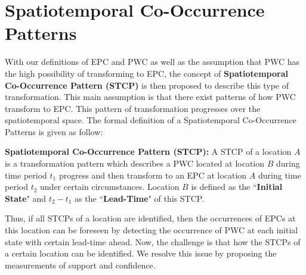 \documentclass{acm_proc_article-sp}
\begin{document}
\section{Spatiotemporal Co-Occurrence Patterns}
\label{sec:stcopattern}
With our definitions of EPC and PWC as well as the assumption that PWC has the high possibility of transforming to EPC, the concept of \textbf{Spatiotemporal Co-Occurrence Pattern (STCP)} is then proposed to describe this type of transformation. This main assumption is that there exist patterns of how PWC transform to EPC. This pattern of transformation progresses over the spatiotemporal space. The formal definition of a Spatiotemporal Co-Occurrence Patterns is given as follow:
\begin{mydef} 
\label{def:STCP}
\textbf{Spatiotemporal Co-Occurrence Pattern (STCP):} A STCP of a location $A$ is a transformation pattern which describes a PWC located at location $B$ during time period $t_1$ progress and then transform to an EPC at location $A$ during time period $t_2$ under certain circumstances. Location $B$ is defined as the ``\textbf{Initial State}" and $t_2 - t_1$ as the ``\textbf{Lead-Time}" of this STCP.     
\end{mydef}
Thus, if all STCPs of a location are identified, then the occurrences of EPCs at this location can be foreseen by detecting the occurrence of PWC at each initial state with certain lead-time ahead. 
\newline 
Now, the challenge is that how the STCPs of a certain location can be identified. We resolve this issue by proposing the measurements of support and confidence. 
\end{document}
